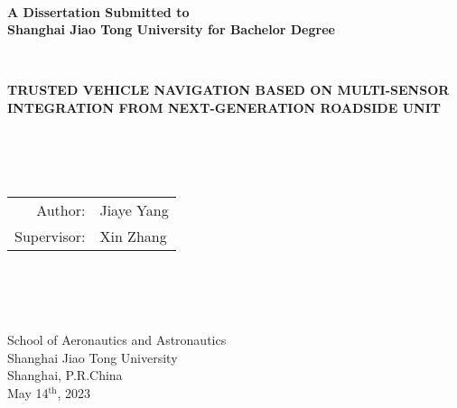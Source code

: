 \newpage
\thispagestyle{empty}
~\\
\begin{center}
\textbf{
A Dissertation Submitted to \\
Shanghai Jiao Tong University for Bachelor Degree}
\end{center}
~\\
\begin{center}
\textbf{
TRUSTED VEHICLE NAVIGATION BASED ON MULTI-SENSOR INTEGRATION FROM NEXT-GENERATION ROADSIDE UNIT}
\end{center}
~\\
~\\
~\\
\begin{center}
\begin{tabular}{r@{ }l}
Author: & Jiaye Yang\\
Supervisor: & Xin Zhang
\end{tabular}
\end{center}
~\\
~\\
~\\
\begin{center}
School of Aeronautics and Astronautics \\
Shanghai Jiao Tong University \\
Shanghai, P.R.China \\
May 14$^{\mathrm{th}}$, 2023 
\end{center}